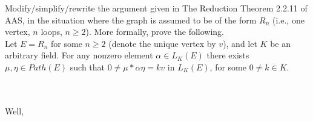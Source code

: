 Modify/simplify/rewrite the argument given in The Reduction Theorem 2.2.11 of AAS, in the situation where the graph 
is assumed to be of the form $R_n$ (i.e., one vertex, $n$ loops, $n\geq2$). More formally, prove the following.\\
Let $E=R_n$ for some $n\geq2$ (denote the unique vertex by $v$), and let $K$ be an arbitrary field. For any nonzero 
element $\alpha\in L_K(E)$ there exists $\mu,\eta\in Path(E)$ such that $0\neq\mu*\alpha\eta =kv$ in $L_K(E)$, for 
some $0\neq k\in K$.\\\\

\begin{solution}\renewcommand{\qedsymbol}{}\ \\
    Well,
\end{solution}
